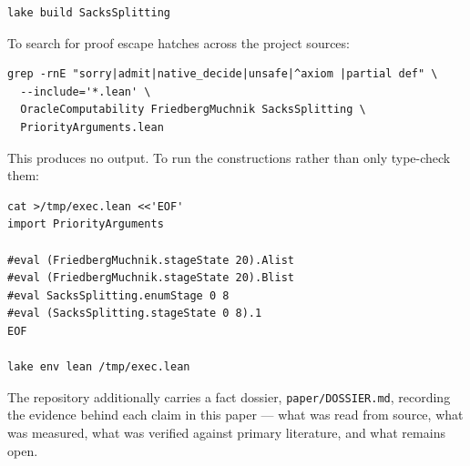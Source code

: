 \begin{verbatim}
lake build SacksSplitting
\end{verbatim}

To search for proof escape hatches across the project sources:

\begin{verbatim}
grep -rnE "sorry|admit|native_decide|unsafe|^axiom |partial def" \
  --include='*.lean' \
  OracleComputability FriedbergMuchnik SacksSplitting \
  PriorityArguments.lean
\end{verbatim}

This produces no output.  To run the constructions rather than only
type-check them:

\begin{verbatim}
cat >/tmp/exec.lean <<'EOF'
import PriorityArguments

#eval (FriedbergMuchnik.stageState 20).Alist
#eval (FriedbergMuchnik.stageState 20).Blist
#eval SacksSplitting.enumStage 0 8
#eval (SacksSplitting.stageState 0 8).1
EOF

lake env lean /tmp/exec.lean
\end{verbatim}

The repository additionally carries a fact dossier,
\texttt{paper/DOSSIER.md}, recording the evidence behind each claim in this
paper --- what was read from source, what was measured, what was verified
against primary literature, and what remains open.
